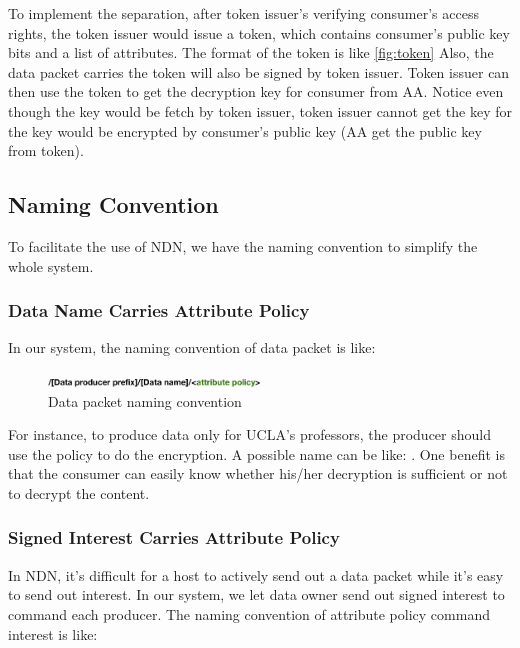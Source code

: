 To implement the separation, after token issuer's verifying consumer's access rights, the token issuer would issue a token, which contains consumer's public key bits and a list of attributes.
The format of the token is like \ref{fig:token}
Also, the data packet carries the token will also be signed by token issuer.
Token issuer can then use the token to get the decryption key for consumer from AA.
Notice even though the key would be fetch by token issuer, token issuer cannot get the key for the key would be encrypted by consumer's public key (AA get the public key from token).

\subsection{Naming Convention}

To facilitate the use of NDN, we have the naming convention to simplify the whole system.

\subsubsection{Data Name Carries Attribute Policy}

In our system, the naming convention of data packet is like:
\begin{figure}[H]
  \centering
  \includegraphics[width=0.5\textwidth]{figures/data-name}
  \vspace{-3mm}
  \caption{Data packet naming convention}
\end{figure}
For instance, to produce data only for UCLA's professors, the producer  should use the policy  to do the encryption.
A possible name can be like: .
One benefit is that the consumer can easily know whether his/her decryption is sufficient or not to decrypt the content.

\subsubsection{Signed Interest Carries Attribute Policy}

In NDN, it's difficult for a host to actively send out a data packet while it's easy to send out interest.
In our system, we let data owner send out signed interest to command each producer.
The naming convention of attribute policy command interest is like:

